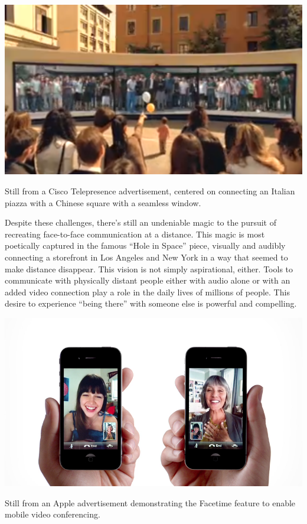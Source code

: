 \begin{marginfigure}
	\includegraphics{figures/cisco-telepresence.png}
	\caption{Still from a Cisco Telepresence advertisement, centered on connecting an Italian piazza with a Chinese square with a seamless window.}
	\label{fig:cisco-telepresence}
\end{marginfigure}

Despite these challenges, there's still an undeniable magic to the pursuit of recreating face-to-face communication at a distance. This magic is most poetically captured in the famous ``Hole in Space'' \citep{HoleinSpace:1980vn} piece, visually and audibly connecting a storefront in Los Angeles and New York in a way that seemed to make distance disappear. This vision is not simply aspirational, either. Tools to communicate with physically distant people either with audio alone or with an added video connection play a role in the daily lives of millions of people. This desire to experience ``being there'' with someone else is powerful and compelling. 


\begin{marginfigure}
	\includegraphics{figures/iphone-face-to-face.png}
	\caption{Still from an Apple advertisement demonstrating the Facetime feature to enable mobile video conferencing.}
	\label{fig:facetime}
\end{marginfigure}

